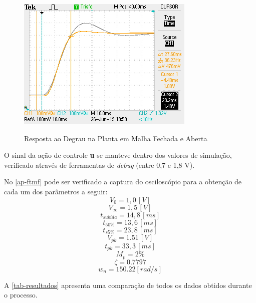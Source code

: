 \documentclass[
	12pt,				%
	article,			%
	openright,			%
	oneside,
	a4paper,			%
	chapter=TITLE,		%
	section=TITLE,		%
	english,			%
	french,				%
	spanish,			%
	brazil,				%
]{abntex2}
\begin{document}
                \begin{figure}[htbp]
                	\centering
                	\caption{Resposta ao Degrau na Planta em Malha Fechada e Aberta}
                	\includegraphics[width=\textwidth,height=240px,keepaspectratio]{imgs/ftmf/step_response.JPG}
                	\label{fig-ftmf-step}
            	\end{figure}
            	
            	O sinal da ação de controle \textbf{u} se manteve dentro dos valores de simulação, verificado através de ferramentas de \textit{debug} (entre 0,7 e 1,8 V).
            	
            	\FloatBarrier
                No \autoref{ap-ftmf} pode ser verificado a captura do osciloscópio para a obtenção de cada um dos parâmetros a seguir:
                $$V_{0}=1,0\,[V]$$
                $$V_{\infty}=1,5\,[V]$$
                $$t_{subida}=14,8\,[ms]$$
                $$t_{50\%}=13,6\,[ms]$$
                $$t_{s5\%}=23,8\,[ms]$$
                $$V_{pk}=1.51\,[V]$$
                $$t_{pk}=33,3\,[ms]$$
                $$M_{p}=2\%$$
                $$\zeta = 0.7797 $$
                $$w_n = 150.22 [rad/s]$$
                \FloatBarrier
                
                A \autoref{tab-resultados} apresenta uma comparação de todos os dados obtidos durante o processo.
                
\end{document}
